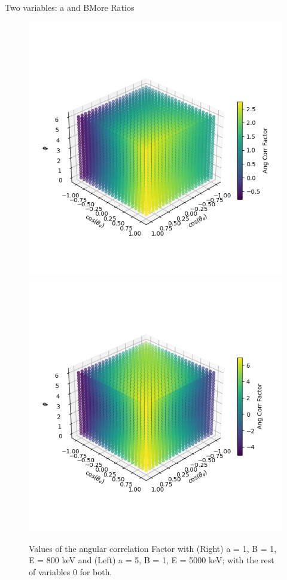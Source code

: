 \documentclass{beamer}
\begin{document}
\begin{frame}{Two variables: a and B}{More Ratios}
	\begin{figure}
		\centering
		\includegraphics[width=0.4\paperwidth]{plots/posa_posB_medE_3D}
		\includegraphics[width=0.4\paperwidth]{plots/posa_posB_vhia_3D}
		\caption{Values of the angular correlation Factor with (Right) a = 1, B = 1, E = 800 keV and (Left) a = 5, B = 1, E = 5000 keV; with the rest of variables 0 for both.}
	\end{figure}
\end{frame}
\end{document}
